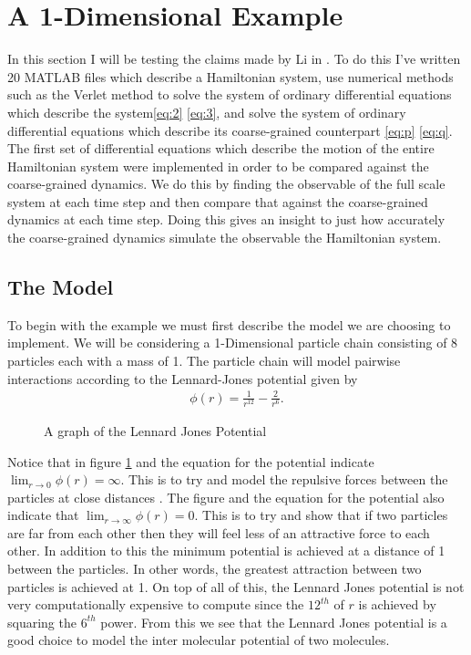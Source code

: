 \section{A 1-Dimensional Example}

In this section I will be testing the claims made by Li in \citep{Li2010}. To do this I've written 20 MATLAB files which describe a Hamiltonian system, use numerical methods such as the Verlet method to solve the system of ordinary differential equations which describe the system\eqref{eq:2} \eqref{eq:3}, and solve the system of ordinary differential equations which describe its coarse-grained counterpart \eqref{eq:p} \eqref{eq:q}. The first set of differential equations which describe the motion of the entire Hamiltonian system were implemented in order to be compared against the coarse-grained dynamics. We do this by finding the observable of the full scale system at each time step and then compare that against the coarse-grained dynamics at each time step. Doing this gives an insight to just how accurately the coarse-grained dynamics simulate the observable the Hamiltonian system.

\subsection{The Model}
To begin with the example we must first describe the model we are choosing to implement. We will be considering a 1-Dimensional particle chain consisting of 8 particles each with a mass of 1. The particle chain will model pairwise interactions according to the Lennard-Jones potential given by 
\begin{align*}
\phi(r) = \frac{1}{r^{12}} - \frac{2}{r^6}.
\end{align*}

\begin{figure}[h]
\centering
\def\svgscale{0.55}

\caption{A graph of the Lennard Jones Potential} \label{figure:3}
\end{figure}

Notice that in figure \ref{figure:3}  and the equation for the potential indicate $\lim_{r\to 0} \phi(r)=\infty$. This is to try and model the repulsive forces between the particles at close distances \cite{BenLeimkuhler2015}. The figure and the equation for the potential also indicate that $\lim_{r\to \infty} \phi(r)= 0$. This is to try and show that if two particles are far from each other then they will feel less of an attractive force to each other. In addition to this the minimum potential is achieved at a distance of 1 between the particles. In other words, the greatest attraction between two particles is achieved at 1. On top of all of this, the Lennard Jones potential is not very computationally expensive to compute since the $12^{th}$ of $r$ is achieved by squaring the $6^{th}$ power\cite{BenLeimkuhler2015}. From this we see that the Lennard Jones potential is a good choice to model the inter molecular potential of two molecules.

